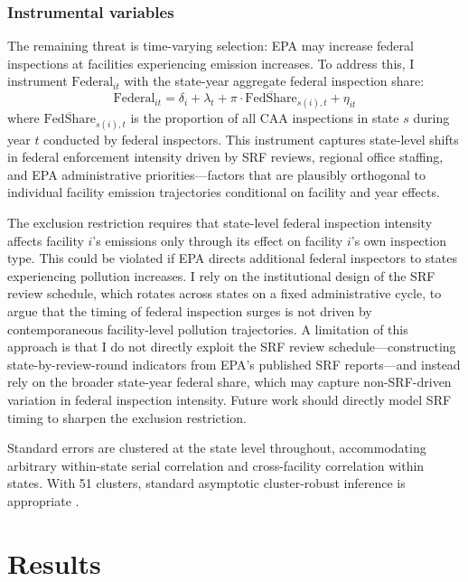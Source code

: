 \documentclass[12pt]{article}
\begin{document}
\subsubsection*{Instrumental variables} The remaining threat is time-varying selection: EPA may increase federal inspections at facilities experiencing emission increases. To address this, I instrument $\text{Federal}_{it}$ with the state-year aggregate federal inspection share:
\begin{equation}
\text{Federal}_{it} = \delta_i + \lambda_t + \pi \cdot \overline{\text{FedShare}}_{s(i),t} + \eta_{it}
\label{eq:fs}
\end{equation}
where $\overline{\text{FedShare}}_{s(i),t}$ is the proportion of all CAA inspections in state $s$ during year $t$ conducted by federal inspectors. This instrument captures state-level shifts in federal enforcement intensity driven by SRF reviews, regional office staffing, and EPA administrative priorities---factors that are plausibly orthogonal to individual facility emission trajectories conditional on facility and year effects.

The exclusion restriction requires that state-level federal inspection intensity affects facility $i$'s emissions only through its effect on facility $i$'s own inspection type. This could be violated if EPA directs additional federal inspectors to states experiencing pollution increases. I rely on the institutional design of the SRF review schedule, which rotates across states on a fixed administrative cycle, to argue that the timing of federal inspection surges is not driven by contemporaneous facility-level pollution trajectories. A limitation of this approach is that I do not directly exploit the SRF review schedule---constructing state-by-review-round indicators from EPA's published SRF reports---and instead rely on the broader state-year federal share, which may capture non-SRF-driven variation in federal inspection intensity. Future work should directly model SRF timing to sharpen the exclusion restriction.

Standard errors are clustered at the state level throughout, accommodating arbitrary within-state serial correlation and cross-facility correlation within states. With 51 clusters, standard asymptotic cluster-robust inference is appropriate \citep{cameron2015practitioners}.


\section{Results}
\end{document}
